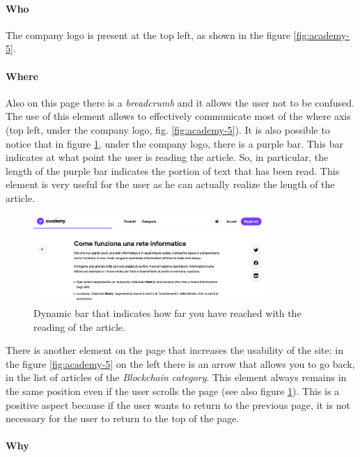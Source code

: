 \paragraph{Who}

The company logo is present at the top left, as shown in the figure 
\ref{fig:academy-5}.

\paragraph{Where}

Also on this page there is a \textit{breadcrumb} and it allows the user 
not to be confused. The use of this element allows to effectively 
communicate  most of the where axis (top left, under the company logo, 
fig. \ref{fig:academy-5}). It is also possible to notice that in figure 
\ref{fig:academy-6}, under the company logo, there is a purple bar. This 
bar indicates at what point the user is reading the article. So, in 
particular, the length of the purple bar indicates the portion of text 
that has been read. This element is very useful for the user as he can 
actually realize the length of the article.

\begin{figure}[H]
  \centering
  \includegraphics[width=0.80\textwidth]{res/images/internal-pages/academy/academy-6.png}
  \caption{Dynamic bar that indicates how far you have reached with the 
  reading of the article.}
  \label{fig:academy-6}
\end{figure}

There is another element on the page that increases the usability of the 
site: in the figure \ref{fig:academy-5} on the left there is an arrow that 
allows you to go back, in the list of articles of the 
\textit{Blockchain category}. This element always remains in the same 
position even if the user scrolls the page (see also figure 
\ref{fig:academy-6}). This is a positive aspect because if the user wants 
to return to the previous page, it is not necessary for the user to return 
to the top of the page.

\paragraph{Why}

